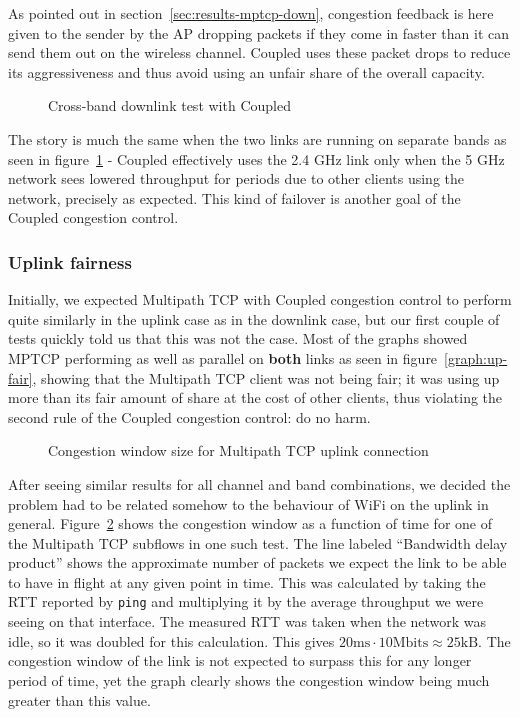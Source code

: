 As pointed out in section~\ref{sec:results-mptcp-down}, congestion feedback is
here given to the sender by the AP dropping packets if they come in faster than
it can send them out on the wireless channel. Coupled uses these packet drops to
reduce its aggressiveness and thus avoid using an unfair share of the overall
capacity.

\begin{figure}[h]
 \centering
 
 \caption{Cross-band downlink test with Coupled}\label{graph:cb-fairness-down}
\end{figure}

The story is much the same when the two links are running on separate bands as
seen in figure~\ref{graph:cb-fairness-down} - Coupled effectively uses the 2.4
GHz link only when the 5 GHz network sees lowered throughput for periods due to
other clients using the network, precisely as expected. This kind of failover is
another goal of the Coupled congestion control.

\subsubsection{Uplink fairness}
Initially, we expected Multipath TCP with Coupled congestion control to perform
quite similarly in the uplink case as in the downlink case, but our first couple
of tests quickly told us that this was not the case. Most of the graphs showed
MPTCP performing as well as parallel on \textbf{both} links as seen in
figure~\ref{graph:up-fair}, showing that the Multipath TCP client was not being
fair; it was using up more than its fair amount of share at the cost of
other clients, thus violating the second rule of the Coupled congestion control:
do no harm.

\begin{figure}[h]
 \centering
 
 \caption{Congestion window size for Multipath TCP uplink connection}\label{graph:fairness-up-close}
\end{figure}

After seeing similar results for all channel and band combinations, we decided
the problem had to be related somehow to the behaviour of WiFi on the uplink in
general. Figure~\ref{graph:fairness-up-close} shows the congestion window as a
function of time for one of the Multipath TCP subflows in one such test. The
line labeled ``Bandwidth delay product'' shows the approximate number of packets
we expect the link to be able to have in flight at any given point in time. This
was calculated by taking the RTT reported by \texttt{ping} and multiplying it by
the average throughput we were seeing on that interface. The measured RTT was
taken when the network was idle, so it was doubled for this calculation. This
gives $20\text{ms} \cdot 10\text{Mbits} \approx 25\text{kB}$. The congestion
window of the link is not expected to surpass this for any longer period of
time, yet the graph clearly shows the congestion window being much greater than
this value.

